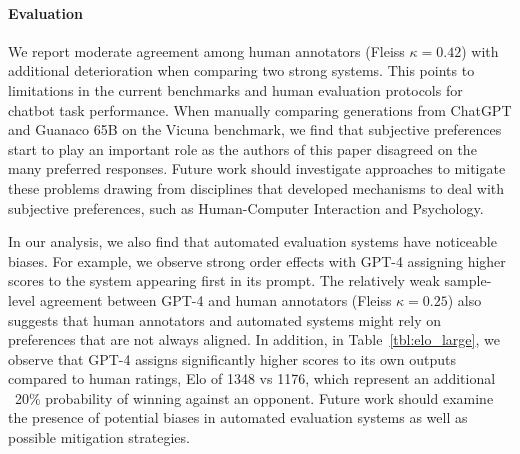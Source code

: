 \documentclass{article}
\newcommand{\method}{\textsc{QLoRA}\xspace}
\newcommand{\model}{{Guanaco}\xspace}
\begin{document}




\paragraph{Evaluation}
We report moderate agreement among human annotators (Fleiss $\kappa=0.42$) with additional deterioration when comparing two strong systems. This points to limitations in the current benchmarks and human evaluation protocols for chatbot task performance. When manually comparing generations from ChatGPT and \model 65B on the Vicuna benchmark, we find that subjective preferences start to play an important role as the authors of this paper disagreed on the many preferred responses. Future work should investigate approaches to mitigate these problems drawing from disciplines that developed mechanisms to deal with subjective preferences, such as Human-Computer Interaction and Psychology.

In our analysis, we also find that automated evaluation systems have noticeable biases. For example, we observe strong order effects with GPT-4 assigning higher scores to the system appearing first in its prompt. The relatively weak sample-level agreement between GPT-4 and human annotators (Fleiss $\kappa=0.25$) also suggests that human annotators and automated systems might rely on preferences that are not always aligned. In addition, in Table~\ref{tbl:elo_large}, we observe that GPT-4 assigns significantly higher scores to its own outputs compared to human ratings, Elo of 1348 vs 1176, which represent an additional ~20\% probability of winning against an opponent. 
Future work should examine the presence of potential biases in automated evaluation systems as well as possible mitigation strategies.
\end{document}
